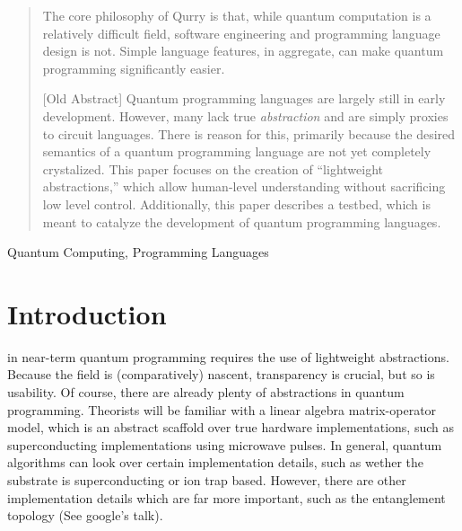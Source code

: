 \documentclass[journal]{IEEEtran}
\begin{document}


\maketitle

\begin{abstract}

    The core philosophy of Qurry is that, while quantum computation is a relatively difficult field, software engineering and programming language design is not.
    Simple language features, in aggregate, can make quantum programming significantly easier. 

[Old Abstract]
Quantum programming languages are largely still in early development. 
However, many lack true \emph{abstraction} and are simply proxies to circuit languages. 
There is reason for this, primarily because the desired semantics of a quantum programming language are not yet completely crystalized. 
This paper focuses on the creation of ``lightweight abstractions,'' which allow human-level understanding without sacrificing low level control.
Additionally, this paper describes a testbed, which is meant to catalyze the development of quantum programming languages.
\end{abstract}

\begin{IEEEkeywords}
    Quantum Computing, Programming Languages
\end{IEEEkeywords}

\IEEEpeerreviewmaketitle


\section{Introduction}
 in near-term quantum programming requires the use of lightweight abstractions. 
Because the field is (comparatively) nascent, transparency is crucial, but so is usability.
Of course, there are already plenty of abstractions in quantum programming. 
Theorists will be familiar with a linear algebra matrix-operator model, which is an abstract scaffold over true hardware implementations, such as superconducting implementations using microwave pulses.
In general, quantum algorithms can look over certain implementation details, such as wether the substrate is superconducting or ion trap based. 
However, there are other implementation details which are far more important, such as the entanglement topology (See google's talk).
\end{document}
